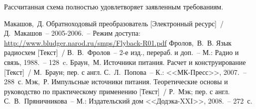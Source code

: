 Рассчитанная схема полностью удовлетворяет заявленным требованиям.

\newpage

\begin{thebibliography}{9}
	 Макашов,~Д. Обратноходовый преобразователь [Электронный ресурс]~/
	Д.~Макашов~-- 2005-2006.~-- Режим доступа:
	\href{http://www.bludger.narod.ru/smps/Flyback-R01.pdf}
	{http://www.bludger.narod.ru/smps/Flyback-R01.pdf}
	 Фролов,~В.~В. Язык радиосхем [Текст]~/ В.~В.~Фролов~-- 2-е изд., перераб.
	и доп.~-- М.: Радио и связь, 1988.~-- 128~c.
	 Браун,~М. Источники питания. Расчет и конструирование [Текст]~/
	М.~Браун; пер. с англ. С.~Л.~Попова~-- К.: <<МК-Пресс>>, 2007.~-- 288~с.
	 Мэк,~Р. Импульсные источники питания. Теоретические основы и руководство по практическому применению [Текст]~/
	Р.~Мэк; пер. с англ. С.~В.~Пряничникова~-- М.: Издательский дом <<Додэка-XXI>>, 2008.~-- 272~с.
\end{thebibliography}

